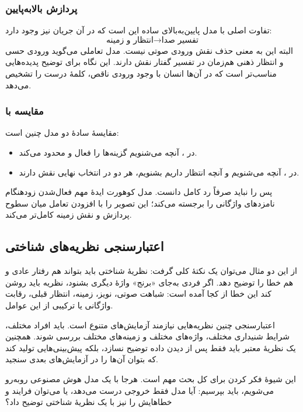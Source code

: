 \subsubsection{پردازش بالا‌به‌پایین}
تفاوت اصلی  با مدل پایین‌به‌بالای ساده این است که در آن جریان  نیز وجود دارد:
\[
\text{انتظار و زمینه} \rightarrow \text{تفسیر صدا}
\]
البته این به معنی حذف نقش ورودی صوتی نیست. مدل تعاملی می‌گوید ورودی حسی و انتظار ذهنی هم‌زمان در تفسیر گفتار نقش دارند. این نگاه برای توضیح پدیده‌هایی مناسب‌تر است که در آن‌ها انسان با وجود ورودی ناقص، کلمهٔ درست را تشخیص می‌دهد.

\subsubsection{مقایسه با }
مقایسهٔ سادهٔ دو مدل چنین است:
\begin{itemize}
  \item در ، آنچه می‌شنویم گزینه‌ها را فعال و محدود می‌کند.
  \item در ، آنچه می‌شنویم و آنچه انتظار داریم بشنویم، هر دو در انتخاب نهایی نقش دارند.
\end{itemize}

پس  را نباید صرفاً رد کامل  دانست. مدل کوهورت ایدهٔ مهم فعال‌شدن زودهنگام نامزدهای واژگانی را برجسته می‌کند؛  این تصویر را با افزودن تعامل میان سطوح پردازش و نقش زمینه کامل‌تر می‌کند.

\subsection{اعتبارسنجی نظریه‌های شناختی}
از این دو مثال می‌توان یک نکتهٔ کلی گرفت: نظریهٔ شناختی باید بتواند هم رفتار عادی و هم خطا را توضیح دهد. اگر فردی به‌جای «برنج» واژهٔ دیگری بشنود، نظریه باید روشن کند این خطا از کجا آمده است: شباهت صوتی، نویز، زمینه، انتظار قبلی، رقابت واژگانی یا ترکیبی از این عوامل.

اعتبارسنجی چنین نظریه‌هایی نیازمند آزمایش‌های متنوع است. باید افراد مختلف، شرایط شنیداری مختلف، واژه‌های مختلف و زمینه‌های مختلف بررسی شوند. همچنین یک نظریهٔ معتبر باید فقط پس از دیدن داده توضیح نسازد، بلکه پیش‌بینی‌هایی تولید کند که بتوان آن‌ها را در آزمایش‌های بعدی سنجید.

این شیوهٔ فکر کردن برای کل بحث مهم است. هرجا با یک مدل هوش مصنوعی روبه‌رو می‌شویم، باید بپرسیم: آیا مدل فقط خروجی درست می‌دهد، یا می‌توان فرایند و خطاهایش را نیز با یک نظریهٔ شناختی توضیح داد؟

